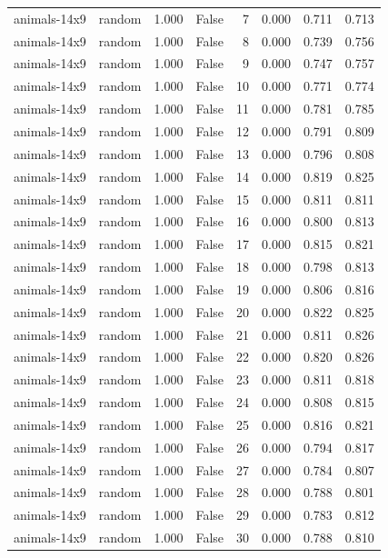 \begin{tabular}{llrrrrrr}
animals-14x9 & random & 1.000 & False & 7 & 0.000 & 0.711 & 0.713 \\
animals-14x9 & random & 1.000 & False & 8 & 0.000 & 0.739 & 0.756 \\
animals-14x9 & random & 1.000 & False & 9 & 0.000 & 0.747 & 0.757 \\
animals-14x9 & random & 1.000 & False & 10 & 0.000 & 0.771 & 0.774 \\
animals-14x9 & random & 1.000 & False & 11 & 0.000 & 0.781 & 0.785 \\
animals-14x9 & random & 1.000 & False & 12 & 0.000 & 0.791 & 0.809 \\
animals-14x9 & random & 1.000 & False & 13 & 0.000 & 0.796 & 0.808 \\
animals-14x9 & random & 1.000 & False & 14 & 0.000 & 0.819 & 0.825 \\
animals-14x9 & random & 1.000 & False & 15 & 0.000 & 0.811 & 0.811 \\
animals-14x9 & random & 1.000 & False & 16 & 0.000 & 0.800 & 0.813 \\
animals-14x9 & random & 1.000 & False & 17 & 0.000 & 0.815 & 0.821 \\
animals-14x9 & random & 1.000 & False & 18 & 0.000 & 0.798 & 0.813 \\
animals-14x9 & random & 1.000 & False & 19 & 0.000 & 0.806 & 0.816 \\
animals-14x9 & random & 1.000 & False & 20 & 0.000 & 0.822 & 0.825 \\
animals-14x9 & random & 1.000 & False & 21 & 0.000 & 0.811 & 0.826 \\
animals-14x9 & random & 1.000 & False & 22 & 0.000 & 0.820 & 0.826 \\
animals-14x9 & random & 1.000 & False & 23 & 0.000 & 0.811 & 0.818 \\
animals-14x9 & random & 1.000 & False & 24 & 0.000 & 0.808 & 0.815 \\
animals-14x9 & random & 1.000 & False & 25 & 0.000 & 0.816 & 0.821 \\
animals-14x9 & random & 1.000 & False & 26 & 0.000 & 0.794 & 0.817 \\
animals-14x9 & random & 1.000 & False & 27 & 0.000 & 0.784 & 0.807 \\
animals-14x9 & random & 1.000 & False & 28 & 0.000 & 0.788 & 0.801 \\
animals-14x9 & random & 1.000 & False & 29 & 0.000 & 0.783 & 0.812 \\
animals-14x9 & random & 1.000 & False & 30 & 0.000 & 0.788 & 0.810 \\

\end{tabular}
